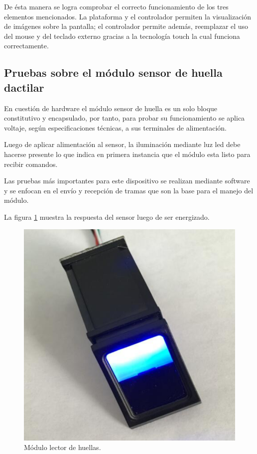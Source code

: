 De ésta manera se logra comprobar el correcto funcionamiento de los tres elementos mencionados. La plataforma y el controlador permiten la visualización de imágenes sobre la pantalla; el controlador permite además, reemplazar el uso del mouse y del teclado externo gracias a la tecnología touch la cual funciona correctamente.

\subsection{Pruebas sobre el módulo sensor de huella dactilar}

En cuestión de hardware el módulo sensor de huella es un solo bloque constitutivo y encapsulado, por tanto, para probar su funcionamiento se aplica voltaje, según especificaciones técnicas, a sus terminales de alimentación.

Luego de aplicar alimentación al sensor, la iluminación mediante luz led debe hacerse presente lo que indica en primera instancia que el módulo esta listo para recibir comandos.

Las pruebas más importantes para este dispositivo se realizan mediante software y se enfocan en el envío y recepción de tramas que son la base para el manejo del módulo.

La figura \ref{fig:sensor} muestra la respuesta del sensor luego de ser energizado.

\begin{figure}[H]
	\centering
	\includegraphics[scale =.3]{./Figures/sensor.png}
	\caption{Módulo lector de huellas.}
	\label{fig:sensor}
\end{figure}

